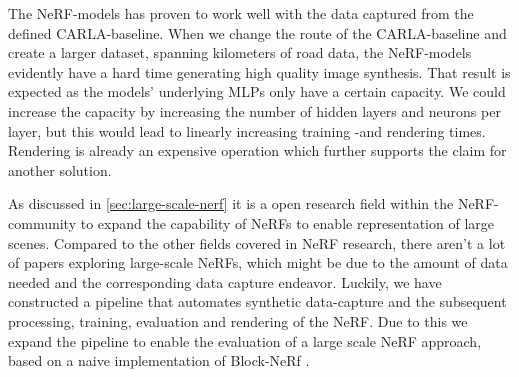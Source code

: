 \begin{comment}
Premise: Have found the CARLA-baseline to work well on shorter segments. As discussed multiple papers, the capacity is limited.
Premise \#2: Since I operate in a synthetic environment, I have perfect poses which simplifies the process.
Question: How do I implement Block-NeRF in Nerfstudio, given perfect poses?

\begin{itemize}
    \item Split the dataset into multiple datasets
    \item Train each seperately
    \item Create a camera path
    \item Render the camera path for each NeRF
\end{itemize}
\end{comment}

The NeRF-models has proven to work well with the data captured from the defined CARLA-baseline. When we change the route of the CARLA-baseline and create a larger dataset, spanning kilometers of road data, the NeRF-models evidently have a hard time generating high quality image synthesis. That result is expected as the models' underlying MLPs only have a certain capacity. We could increase the capacity by increasing the number of hidden layers and neurons per layer, but this would lead to linearly increasing training -and rendering times. Rendering is already an expensive operation which further supports the claim for another solution.

As discussed in \autoref{sec:large-scale-nerf} it is a open research field within the NeRF-community to expand the capability of NeRFs to enable representation of large scenes. Compared to the other fields covered in NeRF research, there aren't a lot of papers exploring large-scale NeRFs, which might be due to the amount of data needed and the corresponding data capture endeavor. Luckily, we have constructed a pipeline that automates synthetic data-capture and the subsequent processing, training, evaluation and rendering of the NeRF. Due to this we expand the pipeline to enable the evaluation of a large scale NeRF approach, based on a naive implementation of Block-NeRf \cite{tancik_block-nerf_2022}.

















































